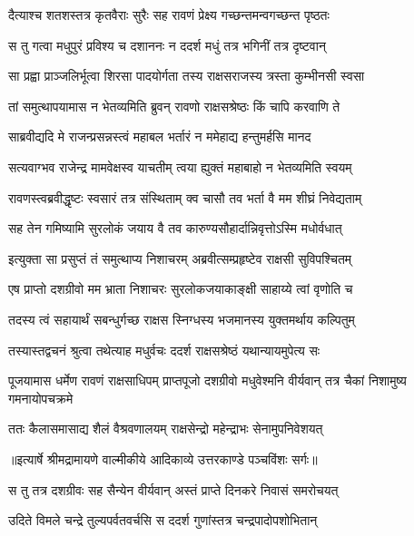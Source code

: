 \twolineshloka
{दैत्याश्च शतशस्तत्र कृतवैराः सुरैः सह}
{रावणं प्रेक्ष्य गच्छन्तमन्वगच्छन्त पृष्ठतः} %

\twolineshloka
{स तु गत्वा मधुपुरं प्रविश्य च दशाननः}
{न ददर्श मधुं तत्र भगिनीं तत्र दृष्टवान्} %

\twolineshloka
{सा प्रह्वा प्राञ्जलिर्भूत्वा शिरसा पादयोर्गता}
{तस्य राक्षसराजस्य त्रस्ता कुम्भीनसी स्वसा} %

\twolineshloka
{तां समुत्थापयामास न भेतव्यमिति ब्रुवन्}
{रावणो राक्षसश्रेष्ठः किं चापि करवाणि ते} %

\twolineshloka
{साब्रवीद्यदि मे राजन्प्रसन्नस्त्वं महाबल}
{भर्तारं न ममेहाद्य हन्तुमर्हसि मानद} %

\twolineshloka
{सत्यवाग्भव राजेन्द्र मामवेक्षस्व याचतीम्}
{त्वया ह्युक्तं महाबाहो न भेतव्यमिति स्वयम्} %

\twolineshloka
{रावणस्त्वब्रवीद्धृष्टः स्वसारं तत्र संस्थिताम्}
{क्व चासौ तव भर्ता वै मम शीघ्रं निवेद्यताम्} %

\twolineshloka
{सह तेन गमिष्यामि सुरलोकं जयाय वै}
{तव कारुण्यसौहार्दान्निवृत्तोऽस्मि मधोर्वधात्} %

\twolineshloka
{इत्युक्ता सा प्रसुप्तं तं समुत्थाप्य निशाचरम्}
{अब्रवीत्सम्प्रहृष्टेव राक्षसी सुविपश्चितम्} %

\twolineshloka
{एष प्राप्तो दशग्रीवो मम भ्राता निशाचरः}
{सुरलोकजयाकाङ्क्षी साहाय्ये त्वां वृणोति च} %

\twolineshloka
{तदस्य त्वं सहायार्थं सबन्धुर्गच्छ राक्षस}
{स्निग्धस्य भजमानस्य युक्तमर्थाय कल्पितुम्} %

\twolineshloka
{तस्यास्तद्वचनं श्रुत्वा तथेत्याह मधुर्वचः}
{ददर्श राक्षसश्रेष्ठं यथान्यायमुपेत्य सः} %

\threelineshloka
{पूजयामास धर्मेण रावणं राक्षसाधिपम्}
{प्राप्तपूजो दशग्रीवो मधुवेश्मनि वीर्यवान्}
{तत्र चैकां निशामुष्य गमनायोपचक्रमे} %

\twolineshloka
{ततः कैलासमासाद्य शैलं वैश्रवणालयम्}
{राक्षसेन्द्रो महेन्द्राभः सेनामुपनिवेशयत्} %


{॥इत्यार्षे श्रीमद्रामायणे वाल्मीकीये आदिकाव्ये उत्तरकाण्डे पञ्चविंशः सर्गः॥}


\twolineshloka
{स तु तत्र दशग्रीवः सह सैन्येन वीर्यवान्}
{अस्तं प्राप्ते दिनकरे निवासं समरोचयत्} %

\twolineshloka
{उदिते विमले चन्द्रे तुल्यपर्वतवर्चसि}
{स ददर्श गुणांस्तत्र चन्द्रपादोपशोभितान्} %

